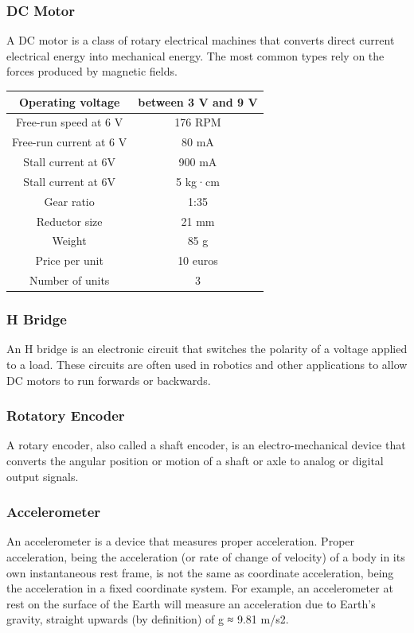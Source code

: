 \subsubsection{DC Motor}
A DC motor is a class of rotary electrical machines that converts
direct current electrical energy into mechanical energy. The most common
types rely on the forces produced by magnetic fields.
\begin{center}
    \begin{tabular}{ |c|c| }
        \hline
        Operating voltage       & between 3 V and 9 V \\
        \hline
        Free-run speed at 6 V   & 176 RPM             \\
        \hline
        Free-run current at 6 V & 80 mA               \\
        \hline
        Stall current at 6V     & 900 mA              \\
        \hline
        Stall current at 6V     & 5 kg·cm             \\
        \hline
        Gear ratio              & 1:35                \\
        \hline
        Reductor size           & 21 mm               \\
        \hline
        Weight                  & 85 g                \\
        \hline
        Price per unit          & 10 euros            \\
        \hline
        Number of units         & 3                   \\
        \hline
    \end{tabular}
\end{center}

\subsubsection{H Bridge}
An H bridge is an electronic circuit that switches the polarity of a
voltage applied to a load. These circuits are often used in robotics
and other applications to allow DC motors to run forwards or backwards.
\subsubsection{Rotatory Encoder}
A rotary encoder, also called a shaft encoder, is an electro-mechanical device that converts the
angular position or motion of a shaft or axle to analog or digital output signals.
\subsubsection{Accelerometer}
An accelerometer is a device that measures proper acceleration. Proper acceleration, being the
acceleration (or rate of change of velocity) of a body in its own instantaneous rest frame, is not the same as coordinate acceleration, being the acceleration in a fixed coordinate system.
For example, an accelerometer at rest on the surface of the Earth will measure an acceleration due
to Earth's gravity, straight upwards (by definition) of g ≈ 9.81 m/s2.
